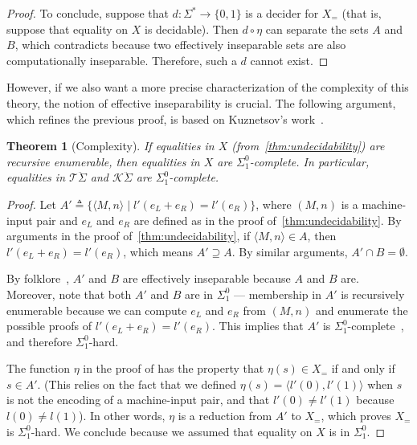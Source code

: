 \documentclass[11pt,a4paper]{amsart}
\newtheorem{theorem}{Theorem}
\theoremstyle{definition}
\begin{document}
\begin{proof}
  To conclude, suppose that $d : \Sigma^* \to \{0,1\}$ is a decider for $X_{=}$
  (that is, suppose that equality on $X$ is decidable).  Then $d \circ \eta$ can
  separate the sets $A$ and $B$, which contradicts
   because two effectively inseparable sets are
  also computationally inseparable. Therefore, such a $d$ cannot exist.
\end{proof}

However, if we also want a more precise characterization of the complexity of
this theory, the notion of effective inseparability is crucial.  The following
argument, which refines the previous proof, is based on Kuznetsov's
work~\cite{Kuznetsov23}.


\begin{theorem}[Complexity]
  If equalities in \(X\) (from~\cref{thm:undecidability}) are recursive
  enumerable, then equalities in \(X\) are \(\Sigma^0_1\)-complete.  In
  particular, equalities in $\mathcal{T}\ddot{ \Sigma }$ and
  $\mathcal{K}\ddot{ \Sigma }$ are \(\Sigma^0_1\)-complete.
\end{theorem}


\begin{proof}
  Let $A' \triangleq \{ \langle M, n \rangle \mid l'(e_L+e_R) = l'(e_R) \}$,
  where $(M,n)$ is a machine-input pair and $e_L$ and $e_R$ are defined as in
  the proof of~\cref{thm:undecidability}.  By arguments in the proof
  of~\cref{thm:undecidability}, if $\langle M, n\rangle \in A$, then
  \(l'(e_L+e_R) = l'(e_R)\), which means \(A' \supseteq A\).  By similar
  arguments, $A' \cap B = \emptyset$.

  By folklore~\cite[Proposition 9]{Kuznetsov23}, \(A'\) and \(B\) are
  effectively inseparable because $A$ and $B$ are.  Moreover, note that both
  \(A'\) and \(B\) are in \(\Sigma^0_1\) --- membership in \(A'\) is recursively
  enumerable because we can compute $e_L$ and $e_R$ from $(M,n)$ and enumerate
  the possible proofs of $l'(e_L+e_R) = l'(e_R)$.  This implies that \(A'\) is
  \(\Sigma^0_1\)-complete~\cite[Proposition 7]{Kuznetsov23}, and therefore
  \(\Sigma^0_1\)-hard.

  The function $\eta$ in the proof of  has the property
  that $\eta(s) \in X_{=}$ if and only if $s \in A'$. (This relies on the fact
  that we defined $\eta(s) = \langle l'(0), l'(1)\rangle$ when $s$ is not the
  encoding of a machine-input pair, and that $l'(0) \neq l'(1)$ because
  $l(0) \neq l(1)$).  In other words, $\eta$ is a reduction from $A'$ to
  $X_{=}$, which proves $X_{=}$ is $\Sigma^0_1$-hard.  We conclude because we
  assumed that equality on $X$ is in $\Sigma^0_1$.
\end{proof}
\end{document}
